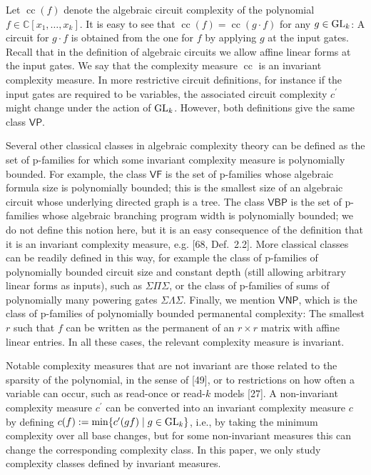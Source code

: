 \documentclass[10pt,a4paper]{article}
\begin{document}
Let $\operatorname{cc}(f)$ denote the algebraic circuit complexity of the polynomial $f\in\mathbb{C}[x_{1},\ldots,x_{k}]$. It is easy to see that $\operatorname{cc}(f)=\operatorname{cc}(g\cdot f)$ for any $g\in\textnormal{GL}_{k}$: A circuit for $g\cdot f$ is obtained from the one for $f$ by applying $g$ at the input gates. Recall that in the definition of algebraic circuits we allow affine linear forms at the input gates. We say that the complexity measure $\operatorname{cc}$ is an invariant complexity measure.
In more restrictive circuit definitions, for instance if the input gates are required to be variables, the associated circuit complexity $c^{\prime}$ might change under the action of $\textnormal{GL}_{k}$. However, both definitions give the same class $\mathsf{VP}$.





Several other classical classes in algebraic complexity theory can be defined as the set of p-families for which some invariant complexity measure is polynomially bounded.
For example, the class $\mathsf{VF}$ is the set of p-families whose algebraic formula size is polynomially bounded; this is the smallest size of an algebraic circuit whose underlying directed graph is a tree. The class $\mathsf{VBP}$ is the set of p-families whose algebraic branching program width is polynomially bounded; we do not define this notion here, but it is an easy consequence of the definition that it is an invariant complexity measure, e.g. [68, Def. 2.2]. More classical classes can be readily defined in this way, for example the class of p-families of polynomially bounded circuit size and constant depth (still allowing arbitrary linear forms as inputs), such as $\Sigma\Pi\Sigma$, or the class of p-families of sums of polynomially many powering gates $\Sigma\Lambda\Sigma$.
Finally, we mention $\mathsf{VNP}$, which is the class of p-families of polynomially bounded permanental complexity: The smallest $r$ such that $f$ can be written as the permanent of an $r\times r$ matrix with affine linear entries. In all these cases, the relevant complexity measure is invariant.





Notable complexity measures that are not invariant are those related to the sparsity of the polynomial, in the sense of [49], or to restrictions on how often a variable can occur, such as read-once or read-$k$ models [27]. A non-invariant complexity measure $c^{\prime}$ can be converted into an invariant complexity measure $c$ by defining $c(f):=\min\{c^{\prime}(gf)\mid g\in\textnormal{GL}_{k}\}$, i.e., by taking the minimum complexity over all base changes, but for some non-invariant measures this can change the corresponding complexity class. In this paper, we only study complexity classes defined by invariant measures.
\end{document}
